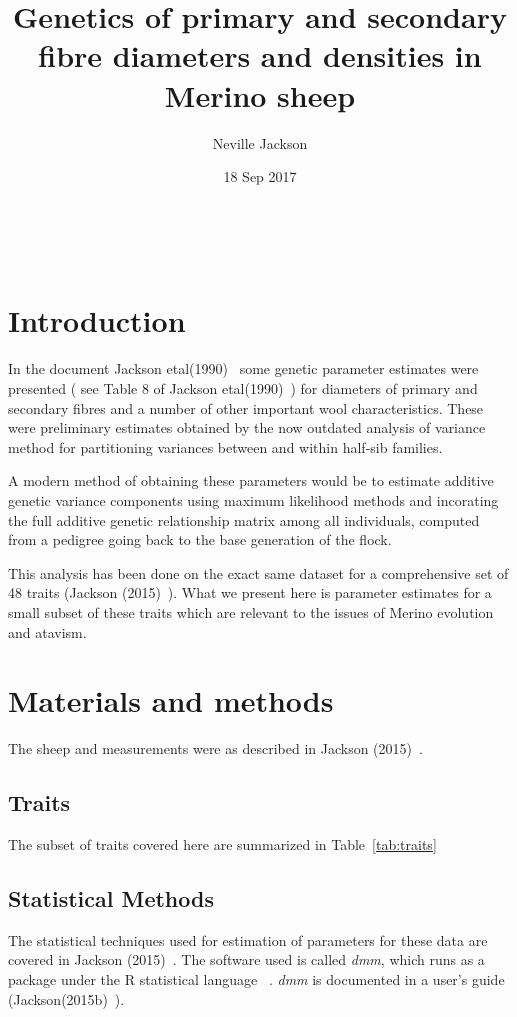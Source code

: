 \documentclass[titlepage]{article}  %
\title{Genetics of primary and secondary fibre diameters and densities in Merino sheep}
\author{Neville Jackson}
\date{18 Sep 2017}
\begin{document}
 


 
\maketitle      
\tableofcontents

$\newcommand{\E}{\mathrm{E}}$
$\newcommand{\Var}{\mathrm{Var}}$
$\newcommand{\Cov}{\mathrm{Cov}}$ 
$\newcommand{\SD}{\mathrm{SD}}$ 

\clearpage
\section{Introduction} 
In the document Jackson etal(1990)~\cite{jack:90} some genetic parameter estimates were presented ( see Table 8 of Jackson etal(1990)~\cite{jack:90}) for diameters of primary and secondary fibres and a number of  other important wool characteristics. These were preliminary estimates obtained by the now outdated analysis of variance method for partitioning variances between and within half-sib families. 

A modern method of obtaining these parameters would be to estimate additive genetic variance components using maximum likelihood methods and incorating the full additive genetic relationship matrix  among all individuals, computed from a pedigree going back to the base generation of the flock. 

This analysis has been done on the exact same dataset for a comprehensive set of 48 traits (Jackson (2015)~\cite{jack:15}). What we present here is parameter estimates for a small subset of these traits which are relevant to the issues of Merino evolution and atavism.

\section{Materials and methods}
The sheep and measurements were as described in Jackson (2015)~\cite{jack:15}.
\subsection{Traits}
The subset of traits covered here are summarized in Table~\ref{tab:traits}


\subsection{Statistical Methods}
The statistical techniques used for estimation of parameters for these data are covered in Jackson (2015)~\cite{jack:15}.  The software used is called {\em dmm}, which runs as a package under the R statistical language ~\cite{}. {\em dmm} is documented in a user's guide (Jackson(2015b)~\cite{jack:15b}).
\end{document}
